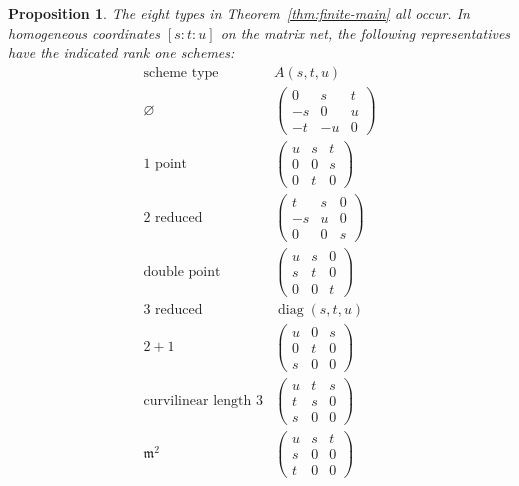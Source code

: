 \documentclass[11pt]{amsart}
\newcommand{\chg}[1]{#1}
\theoremstyle{plain}
\newtheorem{proposition}[theorem]{Proposition}
\theoremstyle{definition}
\theoremstyle{remark}
\begin{document}
\begin{proposition}\label{prop:finite-representatives}
The eight types in Theorem~\ref{thm:finite-main} all occur. In homogeneous coordinates $[s:t:u]$ on the matrix net, the following representatives have the indicated \chg{rank one} schemes:
\[
\begin{array}{c|c}
\text{scheme type}&A(s,t,u)\\ \hline
\varnothing&\begin{pmatrix}0&s&t\\-s&0&u\\-t&-u&0\end{pmatrix}\\[2.0ex]
1\text{ point}&\begin{pmatrix}u&s&t\\0&0&s\\0&t&0\end{pmatrix}\\[2.0ex]
2\text{ reduced}&\begin{pmatrix}t&s&0\\-s&u&0\\0&0&s\end{pmatrix}\\[2.0ex]
\text{double point}&\begin{pmatrix}u&s&0\\s&t&0\\0&0&t\end{pmatrix}\\[2.0ex]
3\text{ reduced}&\operatorname{diag}(s,t,u)\\[1.0ex]
2+1&\begin{pmatrix}u&0&s\\0&t&0\\s&0&0\end{pmatrix}\\[2.0ex]
\text{curvilinear length }3&\begin{pmatrix}u&t&s\\t&s&0\\s&0&0\end{pmatrix}\\[2.0ex]
\mathfrak m^2&\begin{pmatrix}u&s&t\\s&0&0\\t&0&0\end{pmatrix}
\end{array}
\]
\end{proposition}
\end{document}

